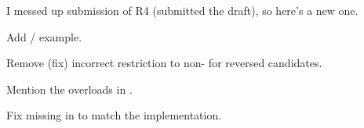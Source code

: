 \begin{revision}
\item I messed up submission of R4 (submitted the draft), so here's a new one.
\item Add  /  example.
\item Remove (fix) incorrect restriction to non-  for reversed candidates.
\item Mention the   overloads in .
\item Fix missing  in  to match the implementation.
\end{revision}

